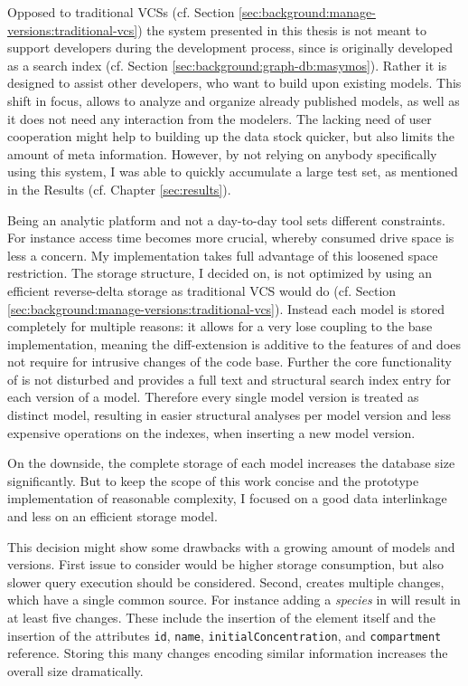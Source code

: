 
Opposed to traditional VCSs (cf. Section \ref{sec:background:manage-versions:traditional-vcs}) the system presented in this thesis is not meant to support developers during the development process, since \masymos is originally developed as a search index (cf. Section \ref{sec:background:graph-db:masymos}).
Rather it is designed to assist other developers, who want to build upon existing models.
This shift in focus, allows to analyze and organize already published models, as well as it does not need any interaction from the modelers. The lacking need of user cooperation might help to building up the data stock quicker, but also limits the amount of meta information.
However, by not relying on anybody specifically using this system, I was able to quickly accumulate a large test set, as mentioned in the Results (cf. Chapter \ref{sec:results}).

Being an analytic platform and not a day-to-day tool sets different constraints. For instance access time becomes more crucial, whereby consumed drive space is less a concern.
My implementation takes full advantage of this loosened space restriction.
The storage structure, I decided on, is not optimized by using an efficient reverse-delta storage as traditional VCS would do (cf. Section \ref{sec:background:manage-versions:traditional-vcs}).
Instead each model is stored completely for multiple reasons: it allows for a very lose coupling to the base \masymos implementation, meaning the diff-extension is additive to the features of \masymos and does not require for intrusive changes of the code base.
Further the core functionality of \masymos is not disturbed and provides a full text and structural search index entry for each version of a model.
Therefore every single model version is treated as distinct model, resulting in easier structural analyses per model version and less expensive operations on the indexes, when inserting a new model version.

On the downside, the complete storage of each model increases the database size significantly. But to keep the scope of this work concise and the prototype implementation of reasonable complexity, I focused on a good data interlinkage and less on an efficient storage model.

This decision might show some drawbacks with a growing amount of models and versions.
First issue to consider would be higher storage consumption, but also slower query execution should be considered.
Second, \bives creates multiple changes, which have a single common source. For instance adding a \emph{species} in \sbml will result in at least five changes. These include the insertion of the element itself and the insertion of the attributes \texttt{id}, \texttt{name}, \texttt{initialConcentration}, and \texttt{compartment} reference.
Storing this many changes encoding similar information increases the overall size dramatically.

